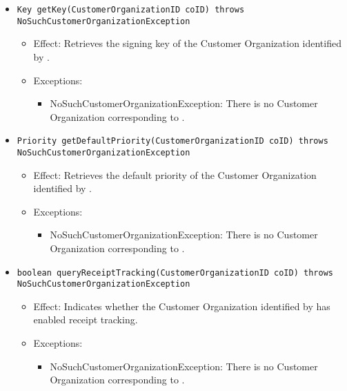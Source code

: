 \begin{itemize}
\begin{itemize}
        \item \texttt{Key getKey(CustomerOrganizationID coID) throws NoSuchCustomerOrganizationException}
		    \begin{itemize}
                \item Effect: Retrieves the signing key of the Customer Organization identified by .
                \item Exceptions:
				\begin{itemize}
					\item NoSuchCustomerOrganizationException: There is no Customer Organization corresponding to .
				\end{itemize}
            \end{itemize}

		\item \texttt{Priority getDefaultPriority(CustomerOrganizationID coID) throws NoSuchCustomerOrganizationException}
		    \begin{itemize}
                \item Effect: Retrieves the default priority of the Customer Organization identified by .
                \item Exceptions:
				\begin{itemize}
					\item NoSuchCustomerOrganizationException: There is no Customer Organization corresponding to .
				\end{itemize}
            \end{itemize}

		\item \texttt{boolean queryReceiptTracking(CustomerOrganizationID coID) throws NoSuchCustomerOrganizationException}
		    \begin{itemize}
                \item Effect: Indicates whether the Customer Organization identified by  has enabled receipt tracking.
                \item Exceptions:
				\begin{itemize}
					\item NoSuchCustomerOrganizationException: There is no Customer Organization corresponding to .
				\end{itemize}
            \end{itemize}


\end{itemize}
\end{itemize}
